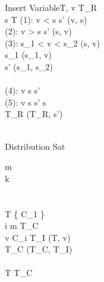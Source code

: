 \begin{pseudocode}{Insert Variable}{T, v}
	T_R \GETS \emptyset \\
	\FOREACH {} s  T \DO
		\BEGIN
			\CASE(1): v < s \THEN
				s' \GETS {}(v, s)\\
			\CASE(2): v > s \THEN
				s' \GETS {}(s, v)\\
			\CASE(3): s_1 < v < s_2 \THEN
				\BEGIN
				[s_1, s_2] \GETS {}(s, v)\\
				s_1 \GETS {}(s_1, v)\\
				s' \GETS {}(s_1, s_2)\\
				\END \\
			\CASE(4): \neg v \in s \THEN
				s' \GETS \emptyset \\
			\CASE(5): v \in s \THEN
				s' \GETS s\\
			T_R \GETS {}(T_R, s') \\
		\END \\
\end{pseudocode}

\begin{pseudocode}{Distribution Sat}{\phi}

m \\
k \\
\\

\\
T \GETS \{ C_1 \} \\

\FOR i   m \DO
	\BEGIN 
		T_C \GETS \emptyset \\
	\FOREACH {} v  C_i \DO
		\BEGIN
			T_I \GETS {}(T, v)\\
			T_C \GETS {}(T_C, T_I)\\
		\END\\
		T \GETS T_C\\
	\END
\\
\end{pseudocode}


